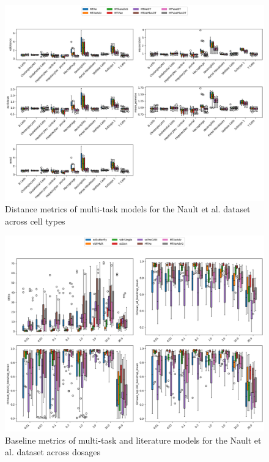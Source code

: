 \documentclass[12pt, a4paper]{article}
\begin{document}
\begin{figure}[h!]
    \centering
    \includegraphics[width=.85\textwidth]{multi_task_benchmarking_cell_type_distance_metrics_nault.png}
    \caption{Distance metrics of multi-task models for the Nault et al. \cite{nault2021single,nault2022benchmarking} dataset across cell types}
\end{figure}


\begin{figure}[h!]
    \centering
    \includegraphics[width=.85\textwidth]{selected_benchmarking_doses_baseline_metrics_nault.png}
    \caption{Baseline metrics of multi-task and literature models for the Nault et al. \cite{nault2021single,nault2022benchmarking} dataset across dosages}
    \label{fig:selected_nault_doses_baseline}
\end{figure}
\end{document}
